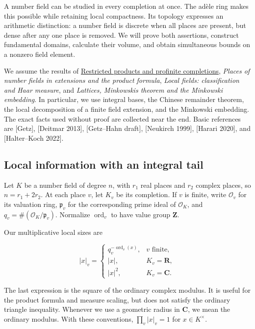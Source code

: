 \documentclass[
  english,
  11pt,
  a4paper,
]{article}
\begin{document}
A number field can be studied in every completion at once. The adèle
ring makes this possible while retaining local compactness. Its topology
expresses an arithmetic distinction: a number field is discrete when all
places are present, but dense after any one place is removed. We will
prove both assertions, construct fundamental domains, calculate their
volume, and obtain simultaneous bounds on a nonzero field element.

We assume the results of \hyperref[NT-ADL-01]{Restricted products and
profinite completions}, \emph{Places of number fields in extensions and
the product formula}, \emph{Local fields: classification and Haar
measure}, and \emph{Lattices, Minkowski\textquotesingle s theorem and
the Minkowski embedding}. In particular, we use integral bases, the
Chinese remainder theorem, the local decomposition of a finite field
extension, and the Minkowski embedding. The exact facts used without
proof are collected near the end. Basic references are {[}Getz{]},
{[}Deitmar 2013{]}, {[}Getz--Hahn draft{]}, {[}Neukirch 1999{]},
{[}Harari 2020{]}, and {[}Halter--Koch 2022{]}.

\subsection{Local information with an integral
tail}\label{NT-ADL-02--local-information-with-an-integral-tail}

Let \(K\) be a number field of degree \(n\), with \(r_1\) real places
and \(r_2\) complex places, so \(n=r_1+2r_2\). At each place \(v\), let
\(K_v\) be its completion. If \(v\) is finite, write \(\mathcal O_v\)
for its valuation ring, \(\mathfrak p_v\) for the corresponding prime
ideal of \(\mathcal O_K\), and \(q_v=\#(\mathcal O_K/\mathfrak p_v)\).
Normalize \(\operatorname{ord}_v\) to have value group \(\mathbf Z\).

Our multiplicative local sizes are

\[|x|_v=
\begin{cases}
q_v^{-\operatorname{ord}_v(x)},&v\text{ finite},\\
|x|,&K_v=\mathbf R,\\
|x|^2,&K_v=\mathbf C.
\end{cases}\]

The last expression is the square of the ordinary complex modulus. It is
useful for the product formula and measure scaling, but does not satisfy
the ordinary triangle inequality. Whenever we use a geometric radius in
\(\mathbf C\), we mean the ordinary modulus. With these conventions,
\(\prod_v|x|_v=1\) for \(x\in K^\times\).
\end{document}
